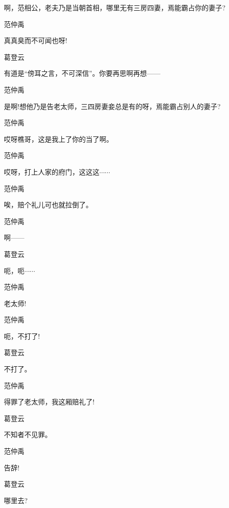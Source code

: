 啊，范相公，老夫乃是当朝首相，哪里无有三房四妻，焉能霸占你的妻子?

范仲禹\hspace{20pt}~

真真臭而不可闻也呀!

葛登云\hspace{20pt}~

有道是``傍耳之言，不可深信''。你要再思啊再想------

范仲禹\hspace{20pt}~

是啊!想他乃是告老太师，三四房妻妾总是有的呀，焉能霸占别人的妻子?

范仲禹\hspace{20pt}~

哎呀樵哥，这是我上了你的当了啊。

范仲禹\hspace{20pt}~

哎呀，打上人家的府门，这这这$\cdots{}\cdots{}$

范仲禹\hspace{20pt}~

唉，赔个礼儿可也就拉倒了。

范仲禹\hspace{20pt}~

啊------

葛登云\hspace{20pt}~

呃，呃$\cdots{}\cdots{}$

范仲禹\hspace{20pt}~

老太师!

范仲禹\hspace{20pt}~

呃，不打了!

葛登云\hspace{20pt}~

不打了。

范仲禹\hspace{20pt}~

得罪了老太师，我这厢赔礼了!

葛登云\hspace{20pt}~

不知者不见罪。

范仲禹\hspace{20pt}~

告辞!

葛登云\hspace{20pt}~

哪里去?

